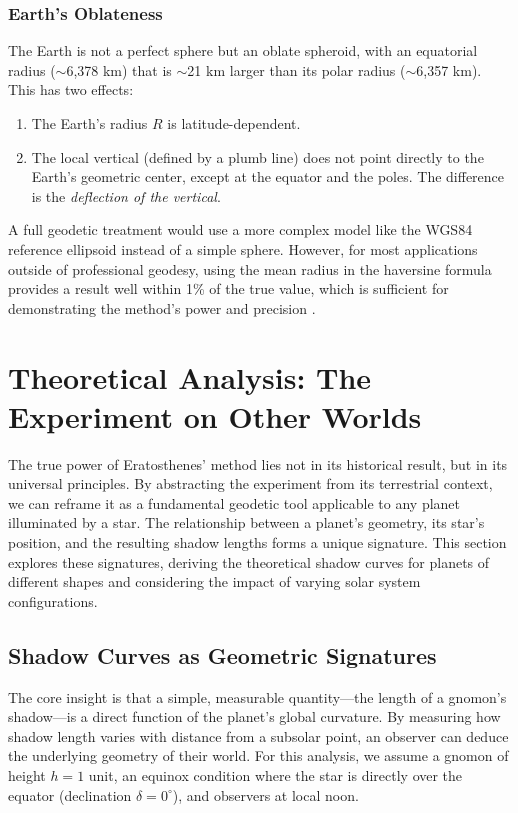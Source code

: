 \documentclass[11pt]{article}
\begin{document}
\subsubsection{Earth's Oblateness}
The Earth is not a perfect sphere but an oblate spheroid, with an equatorial radius ($\sim$6,378 km) that is $\sim$21 km larger than its polar radius ($\sim$6,357 km). This has two effects:
\begin{enumerate}
    \item The Earth's radius $R$ is latitude-dependent.
    \item The local vertical (defined by a plumb line) does not point directly to the Earth's geometric center, except at the equator and the poles. The difference is the \textit{deflection of the vertical}.
\end{enumerate}
A full geodetic treatment would use a more complex model like the WGS84 reference ellipsoid instead of a simple sphere. However, for most applications outside of professional geodesy, using the mean radius in the haversine formula provides a result well within 1\% of the true value, which is sufficient for demonstrating the method's power and precision \cite{Torge2012}.



\section{Theoretical Analysis: The Experiment on Other Worlds}

The true power of Eratosthenes’ method lies not in its historical result, but in its universal principles. By abstracting the experiment from its terrestrial context, we can reframe it as a fundamental geodetic tool applicable to any planet illuminated by a star. The relationship between a planet's geometry, its star's position, and the resulting shadow lengths forms a unique signature. This section explores these signatures, deriving the theoretical shadow curves for planets of different shapes and considering the impact of varying solar system configurations.

\subsection{Shadow Curves as Geometric Signatures}

The core insight is that a simple, measurable quantity—the length of a gnomon's shadow—is a direct function of the planet’s global curvature. By measuring how shadow length varies with distance from a subsolar point, an observer can deduce the underlying geometry of their world. For this analysis, we assume a gnomon of height $h = 1$ unit, an equinox condition where the star is directly over the equator (declination $\delta = 0^{\circ}$), and observers at local noon.
\end{document}
